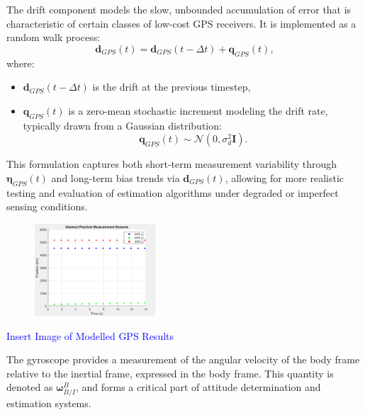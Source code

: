 The drift component models the slow, unbounded accumulation of error that is characteristic of certain classes of low-cost GPS receivers. It is implemented as a random walk process:
\begin{equation}
    \mathbf{d}_{GPS}(t) = \mathbf{d}_{GPS}(t - \Delta t) + \mathbf{q}_{GPS}(t),
\end{equation}
where:
\begin{itemize}
    \item $\mathbf{d}_{GPS}(t - \Delta t)$ is the drift at the previous timestep,
    \item $\mathbf{q}_{GPS}(t)$ is a zero-mean stochastic increment modeling the drift rate, typically drawn from a Gaussian distribution:
    \begin{equation}
        \mathbf{q}_{GPS}(t) \sim \mathcal{N}(0, \sigma_d^2 \mathbf{I}).
    \end{equation}
\end{itemize}

This formulation captures both short-term measurement variability through $\boldsymbol{\eta}_{GPS}(t)$ and long-term bias trends via $\mathbf{d}_{GPS}(t)$, allowing for more realistic testing and evaluation of estimation algorithms under degraded or imperfect sensing conditions.


\begin{figure}[H]
    \centering
    \includegraphics[width=0.4\textwidth]{figures/modelling/GPSMeasurement.png}
    \caption{}
    \label{fig:GPS}
\end{figure}



\textcolor{blue}{Insert Image of Modelled GPS Results}


The gyroscope provides a measurement of the angular velocity of the body frame relative to the inertial frame, expressed in the body frame. This quantity is denoted as $\boldsymbol{\omega}^B_{B/I}$, and forms a critical part of attitude determination and estimation systems.

